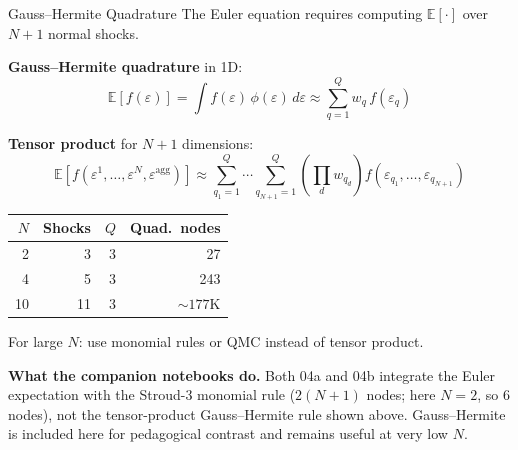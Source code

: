 \documentclass[aspectratio=169,11pt]{beamer}
\newcommand{\emphc}[1]{\textcolor{harvardcrimson}{#1}}
\newcommand{\E}[1]{\mathbb{E}\!\left[#1\right]}
\begin{document}
\begin{frame}{Gauss--Hermite Quadrature}
The Euler equation requires computing $\E{\cdot}$ over $N+1$ normal shocks.

\vspace{0.3em}
\textbf{Gauss--Hermite quadrature} in 1D:
\[
\E{f(\varepsilon)} = \int f(\varepsilon)\, \phi(\varepsilon)\,d\varepsilon \approx \sum_{q=1}^{Q} w_q \, f(\varepsilon_q)
\]

\vspace{0.3em}
\textbf{Tensor product} for $N+1$ dimensions:
\[
\E{f(\varepsilon^1, \ldots, \varepsilon^N, \varepsilon^{\text{agg}})} \approx \sum_{q_1=1}^{Q}\cdots\sum_{q_{N+1}=1}^{Q} \left(\prod_{d} w_{q_d}\right) f(\varepsilon_{q_1}, \ldots, \varepsilon_{q_{N+1}})
\]

\vspace{0.3em}
\begin{center}
\begin{tabular}{rrrr}
\toprule
$N$ & \textbf{Shocks} & $Q$ & \textbf{Quad.\ nodes} \\
\midrule
2 & 3 & 3 & 27 \\
4 & 5 & 3 & 243 \\
10 & 11 & 3 & $\sim 177$K \\
\bottomrule
\end{tabular}
\end{center}

{\small For large $N$: use monomial rules or QMC instead of tensor product.}

\vspace{0.3em}
{\footnotesize \textbf{What the companion notebooks do.} Both 04a and 04b integrate the Euler expectation with the \emphc{Stroud-3 monomial rule} ($2(N+1)$ nodes; here $N=2$, so $6$ nodes), not the tensor-product Gauss--Hermite rule shown above. Gauss--Hermite is included here for pedagogical contrast and remains useful at very low $N$.}
\end{frame}
\end{document}
